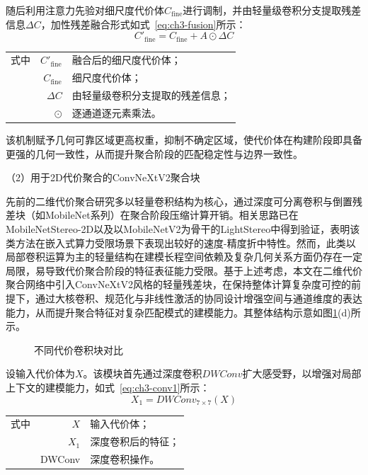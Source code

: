 随后利用注意力先验对细尺度代价体$C_{\text{fine}}$进行调制，并由轻量级卷积分支提取残差信息$\Delta C$，加性残差融合形式如式~\eqref{eq:ch3-fusion}所示：
\begin{equation}\label{eq:ch3-fusion}
C'_{\text{fine}}=C_{\text{fine}}+A\odot\Delta C
\end{equation}
\begin{tabularx}{\textwidth}{@{}l@{\quad}r@{———}X@{}}
式中& $C'_{\text{fine}}$ & 融合后的细尺度代价体；\\
& $C_{\text{fine}}$ & 细尺度代价体；\\
& $\Delta C$ & 由轻量级卷积分支提取的残差信息；\\
& $\odot$ & 逐通道逐元素乘法。\\
\end{tabularx}\vspace{3.15bp}

该机制赋予几何可靠区域更高权重，抑制不确定区域，使代价体在构建阶段即具备更强的几何一致性，从而提升聚合阶段的匹配稳定性与边界一致性。

（2）用于2D代价聚合的ConvNeXtV2聚合块

先前的二维代价聚合研究多以轻量卷积结构为核心，通过深度可分离卷积与倒置残差块（如MobileNet系列\cite{sandlerMobilenetv2InvertedResiduals2018}）在聚合阶段压缩计算开销。相关思路已在MobileNetStereo-2D\cite{shamsafarMobilestereonetLightweightDeep2022a}以及以MobileNetV2\cite{sandlerMobilenetv2InvertedResiduals2018}为骨干的LightStereo\cite{guoLightstereoChannelBoost2025}中得到验证，表明该类方法在嵌入式算力受限场景下表现出较好的速度-精度折中特性。然而，此类以局部卷积运算为主的轻量结构在建模长程空间依赖及复杂几何关系方面仍存在一定局限，易导致代价聚合阶段的特征表征能力受限。基于上述考虑，本文在二维代价聚合网络中引入ConvNeXtV2\cite{wooConvnextV2Codesigning2023a}风格的轻量残差块，在保持整体计算复杂度可控的前提下，通过大核卷积、规范化与非线性激活的协同设计增强空间与通道维度的表达能力，从而提升聚合特征对复杂匹配模式的建模能力。其整体结构示意如图\ref{不同代价卷积块对比}(d)所示。

\begin{figure}[h]
  \centering
  
  \caption{不同代价卷积块对比}
  \label{不同代价卷积块对比}
\end{figure}

设输入代价体为$X$。该模块首先通过深度卷积$DWConv$扩大感受野，以增强对局部上下文的建模能力，如式~\eqref{eq:ch3-conv1}所示：
\begin{equation}\label{eq:ch3-conv1}
X_1=DWConv_{7\times 7}(X)
\end{equation}
\begin{tabularx}{\textwidth}{@{}l@{\quad}r@{———}X@{}}
式中& $X$ & 输入代价体；\\
& $X_1$ & 深度卷积后的特征；\\
& DWConv & 深度卷积操作。\\
\end{tabularx}\vspace{3.15bp}

